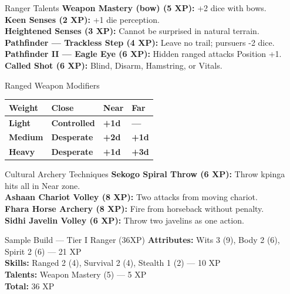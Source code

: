 \documentclass[10pt]{article}
\begin{document}
\begin{minipage}[t]{0.48\linewidth}
    \vspace{0.5em}
    
    \begin{charbox}{Ranger Talents}
        \textbf{Weapon Mastery (bow) (5 XP):} +2 dice with bows.\\
        \textbf{Keen Senses (2 XP):} +1 die perception.\\
        \textbf{Heightened Senses (3 XP):} Cannot be surprised in natural terrain.\\
        \textbf{Pathfinder --- Trackless Step (4 XP):} Leave no trail; pursuers -2 dice.\\
        \textbf{Pathfinder II --- Eagle Eye (6 XP):} Hidden ranged attacks Position +1.\\
        \textbf{Called Shot (6 XP):} Blind, Disarm, Hamstring, or Vitals.
    \end{charbox}
\end{minipage}
\hfill
\begin{minipage}[t]{0.48\linewidth}
    \begin{charbox}{Ranged Weapon Modifiers}
        \begin{tabular}{>{\bfseries}p{2cm} >{\bfseries}p{2cm} >{\bfseries}p{2cm} >{\bfseries}p{2cm}}
            \toprule
            \textbf{Weight} & \textbf{Close} & \textbf{Near} & \textbf{Far} \\
            \midrule
            Light & Controlled & +1d & --- \\
            Medium & Desperate & +2d & +1d \\
            Heavy & Desperate & +1d & +3d \\
            \bottomrule
        \end{tabular}
    \end{charbox}
    
    \vspace{0.5em}
    
    \begin{charbox}{Cultural Archery Techniques}
        \textbf{Sekogo Spiral Throw (6 XP):} Throw kpinga hits all in Near zone.\\
        \textbf{Ashaan Chariot Volley (8 XP):} Two attacks from moving chariot.\\
        \textbf{Fhara Horse Archery (8 XP):} Fire from horseback without penalty.\\
        \textbf{Sidhi Javelin Volley (6 XP):} Throw two javelins as one action.
    \end{charbox}
    
    \vspace{0.5em}
    
    \begin{charbox}{Sample Build --- Tier I Ranger (36XP)}
        \textbf{Attributes:} Wits 3 (9), Body 2 (6), Spirit 2 (6) --- 21 XP\\
        \textbf{Skills:} Ranged 2 (4), Survival 2 (4), Stealth 1 (2) --- 10 XP\\
        \textbf{Talents:} Weapon Mastery (5) --- 5 XP\\
        \textbf{Total:} 36 XP
    \end{charbox}
\end{minipage}
\end{document}
